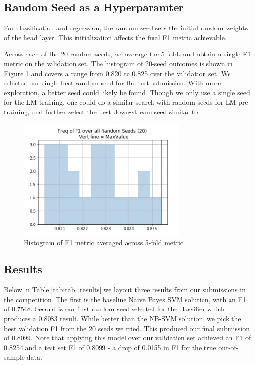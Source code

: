\documentclass[runningheads]{llncs}
\begin{document}
\subsection{Random Seed as a Hyperparamter}
\label{sec:rand_seeds}
For classification and regression, the random seed sets the initial random weights of the head layer. This initialization affects the final F1 metric achievable.  

Across each of the 20 random seeds, we average the 5-folds and obtain a single F1 metric on the validation set. The histogram of 20-seed outcomes is shown in Figure \ref{fig:random_seed_hist} and covers a range  from 0.820 to 0.825 over the validation set. We selected our single best random seed for the test submission. With more exploration, a better seed could likely be found.  Though we only use a single seed for the LM training, one could do a similar search with random seeds for LM pre-training, and further select the best down-stream seed similar to \cite{Poleval:DBLP:journals/corr/abs-1810-10222}

\begin{figure}[ht]
	\includegraphics[width=0.75\textwidth]{seed_hist_f1}
	\caption{Histogram of F1 metric averaged across 5-fold metric}
	\label{fig:random_seed_hist}
\end{figure}

\subsection{Results}
Below in Table \ref{tab:tab_results} we layout three results from our submissions in the competition. The first is the baseline Naive Bayes SVM solution, with an F1 of 0.7548.  Second is our first random seed selected for the classifier which produces a 0.8083 result.  While better than the NB-SVM solution, we pick the best validation F1 from the 20 seeds we tried. This produced our final submission of 0.8099.
Note that applying this model over our validation set achieved an F1 of 0.8254 and a test set F1 of 0.8099 - a drop of 0.0155 in F1 for the true out-of-sample data.
\end{document}

